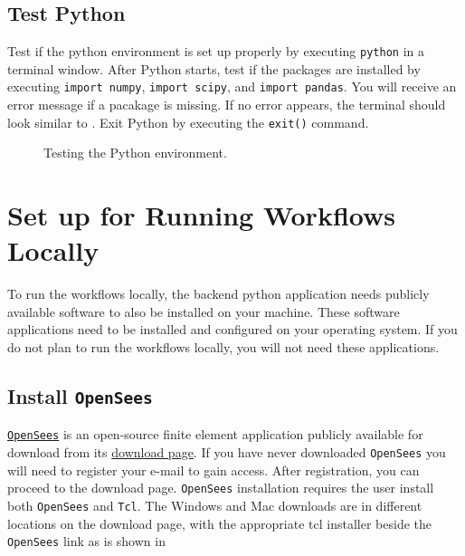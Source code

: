 \subsection{Test Python}

Test if the python environment is set up properly by
executing \texttt{python} in a terminal window. After Python starts,
test if the packages are installed by executing \texttt{import
numpy}, \texttt{import scipy}, and \texttt{import pandas}. You will
receive an error message if a pacakage is missing. If no error
appears, the terminal should look similar
to . Exit Python by executing
the \texttt{exit()} command.

\begin{figure}[!htbp]
  \caption{Testing the Python environment.}
  \label{fig:python_test}
\end{figure}

\section{Set up for Running Workflows Locally}\label{setup}

To run the workflows locally, the backend python application needs
publicly available software to also be installed on your
machine. These software applications need to be installed and
configured on your operating system. If you do not plan to run the
workflows locally, you will not need these applications.

\subsection{Install \texttt{OpenSees}}

\href{https://opensees.berkeley.edu}{\texttt{OpenSees}} is an open-source finite element application publicly available for download from its \href{https://opensees.berkeley.edu/OpenSees/user/download.php}{download page}. If you have never downloaded \texttt{OpenSees} you will need to register your e-mail to gain access. After registration, you can proceed to the download page. \texttt{OpenSees} installation requires the user install both \texttt{OpenSees} and \texttt{Tcl}. The Windows and Mac downloads are in different locations on the download page, with the appropriate tcl installer beside the \texttt{OpenSees} link as is shown in 

